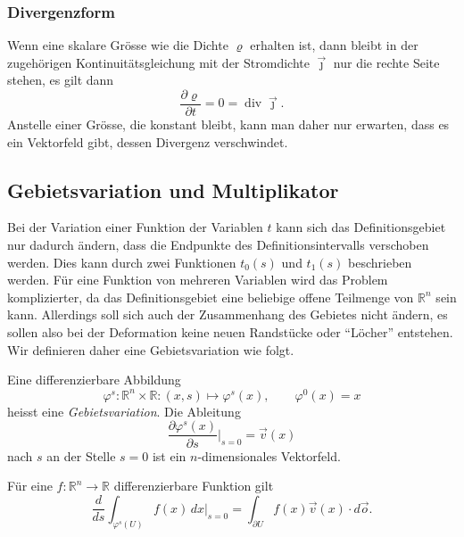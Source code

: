 %
%
\subsubsection{Divergenzform}
%
Wenn eine skalare Grösse wie die Dichte $\varrho$ erhalten ist, dann bleibt
in der zugehörigen Kontinuitätsgleichung mit der Stromdichte
$\vec{\jmath}$ nur die rechte Seite stehen, es gilt dann
\[
\frac{\partial\varrho}{\partial t}
=
0
=
\operatorname{div} \vec{\jmath}.
\]
Anstelle einer Grösse, die konstant bleibt, kann man daher nur erwarten,
dass es ein Vektorfeld gibt, dessen Divergenz verschwindet.

%
%
\subsection{Gebietsvariation und Multiplikator}
Bei der Variation einer Funktion der Variablen $t$ kann sich das
Definitionsgebiet nur dadurch ändern, dass die Endpunkte des
Definitionsintervalls verschoben werden.
Dies kann durch zwei Funktionen $t_0(s)$ und $t_1(s)$ beschrieben werden.
Für eine Funktion von mehreren Variablen wird das Problem komplizierter,
da das Definitionsgebiet eine beliebige offene Teilmenge von $\mathbb{R}^n$
sein kann.
Allerdings soll sich auch der Zusammenhang des Gebietes nicht ändern,
es sollen also bei der Deformation keine neuen Randstücke oder ``Löcher''
entstehen.
Wir definieren daher eine Gebietsvariation wie folgt.

\begin{definition}
Eine differenzierbare Abbildung
\[
\varphi^s
\colon
\mathbb{R}^n\times \mathbb{R}
:
(x,s)
\mapsto
\varphi^s(x),
\qquad
\varphi^0(x)=x
\]
heisst eine {\em Gebietsvariation}.
%
Die Ableitung
\[
\frac{\partial \varphi^s(x)}{\partial s}\bigg|_{s=0}
=
\vec{v}(x)
\]
nach $s$ an der Stelle $s=0$ ist ein $n$-dimensionales Vektorfeld.
\end{definition}

%

\begin{satz}
\label{buch:symmetrien:felder:satz:gebietsintegral}
Für eine $f\colon \mathbb{R}^n\to\mathbb{R}$ differenzierbare Funktion
gilt
\begin{equation}
\frac{d}{ds}
\int_{\varphi^s(U)}
f(x)\,dx
\bigg|_{s=0}
=
\int_{\partial U} f(x)\vec{v}(x)\cdot d\vec{o}.
\label{buch:symmetrien:felder:eqn:gebietsintegral}
\end{equation}
\end{satz}

